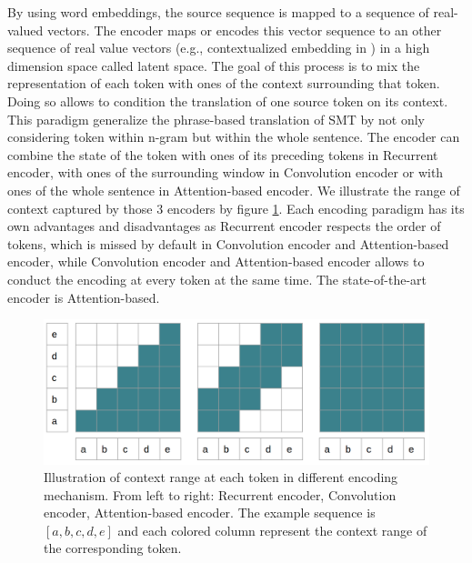 By using word embeddings, the source sequence is mapped to a sequence of real-valued vectors. The encoder maps or encodes this vector sequence to an other sequence of real value vectors (e.g., contextualized embedding in \cite{Vaswani17attention,Bahdanau15learning, Cho14properties}) in a high dimension space called latent space. The goal of this process is to mix the representation of each token with ones of the context surrounding that token. Doing so allows to condition the translation of one source token on its context. This paradigm generalize the phrase-based translation of SMT by not only considering token within n-gram but within the whole sentence. The encoder can combine the state of the token with ones of its preceding tokens in Recurrent encoder, with ones of the surrounding window in Convolution encoder or with ones of the whole sentence in Attention-based encoder. We illustrate the range of context captured by those 3 encoders by figure \ref{fig:encoding}. Each encoding paradigm has its own advantages and disadvantages as Recurrent encoder respects the order of tokens, which is missed by default in Convolution encoder and Attention-based encoder, while Convolution encoder and Attention-based encoder allows to conduct the encoding at every token at the same time. The state-of-the-art encoder is Attention-based.

\begin{figure}[htbp]
\includegraphics[width=\textwidth]{graphics/encoding.png}
\caption[Illustration of context range at each token in different encoding mechanism]{Illustration of context range at each token in different encoding mechanism. From left to right: Recurrent encoder, Convolution encoder, Attention-based encoder. The example sequence is $[a,b,c,d,e]$ and each colored column represent the context range of the corresponding token.}
\label{fig:encoding}
\end{figure}

